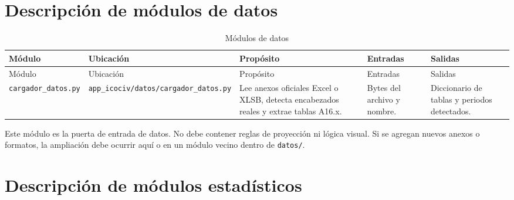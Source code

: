 \documentclass[12pt,letterpaper]{article}
\begin{document}
\section{Descripción de módulos de datos}

\begin{longtable}{p{}p{}p{}p{}p{}}
\caption{Módulos de datos}
\label{tab:modulos_datos}\\
\toprule
Módulo & Ubicación & Propósito & Entradas & Salidas \\
\midrule
\endfirsthead
\toprule
Módulo & Ubicación & Propósito & Entradas & Salidas \\
\midrule
\endhead
\texttt{cargador\_datos.py} & \texttt{app\_icociv/datos/cargador\_datos.py} & Lee anexos oficiales Excel o XLSB, detecta encabezados reales y extrae tablas A16.x. & Bytes del archivo y nombre. & Diccionario de tablas y periodos detectados. \\
\bottomrule
\end{longtable}

Este módulo es la puerta de entrada de datos. No debe contener reglas de proyección ni lógica visual. Si se agregan nuevos anexos o formatos, la ampliación debe ocurrir aquí o en un módulo vecino dentro de \texttt{datos/}.

\section{Descripción de módulos estadísticos}
\end{document}
